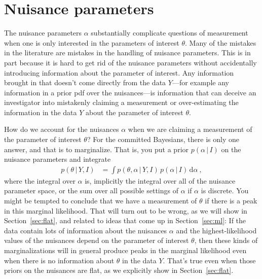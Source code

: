 \documentclass{article}
\newcommand{\sectionname}{Section}
\newcommand{\secref}[1]{\sectionname~\ref{#1}}
\newcommand{\dd}{\mathrm{d}}
\newcommand{\given}{\,|\,}
\begin{document}
\section{Nuisance parameters}\label{sec:nuisance}
The nuisance parameters $\alpha$ substantially complicate questions of measurement when one is only interested in the parameters of interest $\theta$.
Many of the mistakes in the literature are mistakes in the handling of nuisance parameters.
This is in part because it is hard to get rid of the nuisance parameters without accidentally introducing information about the parameter of interest.
Any information brought in that doesn't come directly from the data $Y$---for example any information in a prior pdf over the nuisances---is information that can deceive an investigator into mistakenly claiming a measurement or over-estimating the information in the data $Y$ about the parameter of interest $\theta$.

How do we account for the nuisances $\alpha$ when we are claiming a measurement of the parameter of interest $\theta$?
For the committed Bayesians, there is only one answer, and that is to marginalize.
That is, you put a prior $p(\alpha\given I)$ on the nuisance parameters and integrate
\begin{align}
    p(\theta\given Y,I) &= \int p(\theta,\alpha\given Y,I)\,p(\alpha\given I)\,\dd\alpha ~,\label{eq:marginallf}
\end{align}
where the integral over $\alpha$ is, implicitly the integral over all of the nuisance parameter space, or the sum over all possible settings of $\alpha$ if $\alpha$ is discrete.
You might be tempted to conclude that we have a measurement of $\theta$ if there is a peak in this marginal likelihood.
That will turn out to be wrong, as we will show in \secref{sec:flat}, and related to ideas that come up in \secref{sec:ml}:
If the data contain lots of information about the nuisances $\alpha$ and the highest-likelihood values of the nuisances depend on the parameter of interest $\theta$, then these kinds of marginalizations will in general produce peaks in the marginal likelihood even when there is no information about $\theta$ in the data $Y$.
That's true even when those priors on the nuisances are flat, as we explicitly show in \secref{sec:flat}.
\end{document}
